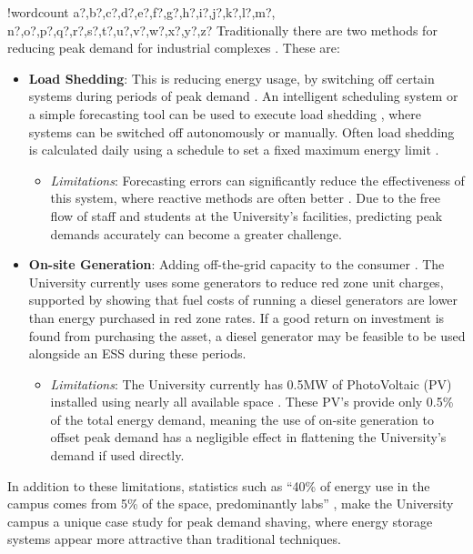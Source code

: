 \documentclass[fontsize=9.5pt]{extarticle}
\numberwithin{figure}{section} %
\providecommand{\tightlist}{%
  \setlength{\itemsep}{0pt}\setlength{\parskip}{0pt}}
\newcounter{words}
\newenvironment{counted}{%
  \setcounter{words}{0}
  \SearchList!{wordcount}{\stepcounter{words}}
    {a?,b?,c?,d?,e?,f?,g?,h?,i?,j?,k?,l?,m?,
    n?,o?,p?,q?,r?,s?,t?,u?,v?,w?,x?,y?,z?}
  \UndoBoundary{'}
  \SearchOrder{p;}}{%
  \StopSearching}
\begin{document}
\begin{counted}
Traditionally there are two methods for reducing peak demand for
industrial complexes \cite{schneiderRECPS}. These are:

\begin{itemize}
\tightlist
\item
  \textbf{Load Shedding}: This is reducing energy usage, by switching
  off certain systems during periods of peak demand \cite{6199851}. An
  intelligent scheduling system or a simple forecasting tool can be used
  to execute load shedding \cite{Reducing37:online}, where systems can
  be switched off autonomously or manually. Often load shedding is
  calculated daily using a schedule to set a fixed maximum energy limit
  \cite{6938948}.

  \begin{itemize}
  \tightlist
  \item
    \emph{Limitations}: Forecasting errors can significantly reduce the
    effectiveness of this system, where reactive methods are often
    better \cite{6938948}. Due to the free flow of staff and students at
    the University's facilities, predicting peak demands accurately can
    become a greater challenge.
  \end{itemize}
\item
  \textbf{On-site Generation}: Adding off-the-grid capacity to the
  consumer \cite{schneiderRECPS}. The University currently uses some
  generators to reduce red zone unit charges, supported by
  \cite{shen2016} showing that fuel costs of running a diesel generators
  are lower than energy purchased in red zone rates. If a good return on
  investment is found from purchasing the asset, a diesel generator may
  be feasible to be used alongside an ESS during these periods.

  \begin{itemize}
  \tightlist
  \item
    \emph{Limitations}: The University currently has 0.5MW of
    PhotoVoltaic (PV) installed using nearly all available space
    \cite{Jbrentmeet}. These PV's provide only 0.5\% of the total energy
    demand, meaning the use of on-site generation to offset peak demand
    has a negligible effect in flattening the University's demand if
    used directly.
  \end{itemize}
\end{itemize}

In addition to these limitations, statistics such as ``40\% of energy
use in the campus comes from 5\% of the space, predominantly labs''
\cite{brentemail}, make the University campus a unique case study for
peak demand shaving, where energy storage systems appear more attractive
than traditional techniques.


\end{counted}
\end{document}
